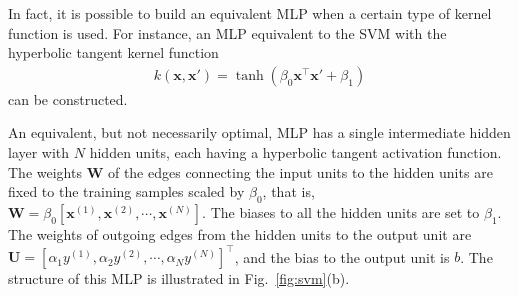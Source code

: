 \documentclass{now}
\newcommand{\vect}[1]{\mathbf{#1}}
\newcommand{\matr}[1]{\mathbf{#1}}
\newcommand{\vx}[0]{\vect{x}}
\newcommand{\mW}[0]{\matr{W}}
\newcommand{\mU}[0]{\matr{U}}
\begin{document}
In fact, it is possible to build an equivalent MLP when a
certain type of kernel function is used. For instance, an
MLP equivalent to the SVM with the hyperbolic tangent kernel
function %
\begin{align*}
    k(\vx, \vx') = \tanh(\beta_0 \vx^\top \vx' + \beta_1)
\end{align*}
can be constructed.

An equivalent, but not necessarily optimal, MLP has a
single intermediate hidden layer with $N$ hidden units, each
having a hyperbolic tangent activation function. The weights
$\mW$ of the edges connecting the input units to the hidden
units are fixed to the training samples scaled by $\beta_0$,
that is, $\mW = \beta_0 \left[ \vx^{(1)}, \vx^{(2)}, \cdots,
\vx^{(N)} \right]$. The biases to all the hidden units are
set to $\beta_1$. The weights of outgoing edges from the
hidden units to the output unit are $\mU = \left[ \alpha_1 y^{(1)}, \alpha_2 y^{(2)}, \cdots, \alpha_N y^{(N)}
\right]^\top$, and the bias to the output unit is $b$. The
structure of this MLP is illustrated in
Fig.~\ref{fig:svm}(b).
\end{document}
